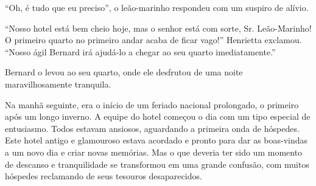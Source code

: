 ``Oh, é tudo que eu preciso'', o leão-marinho respondeu com um suspiro de alívio.

``Nosso hotel está bem cheio hoje, mas o senhor está com sorte, Sr. Leão-Marinho! O primeiro quarto no primeiro andar acaba de ficar vago!'' Henrietta exclamou. ``Nosso ágil Bernard irá ajudá-lo a chegar ao seu quarto imediatamente.''

Bernard o levou ao seu quarto, onde ele desfrutou de uma noite maravilhosamente tranquila.

\vspace{4em}
Na manhã seguinte, era o início de um feriado nacional prolongado, o primeiro após um longo inverno. A equipe do hotel começou o dia com um tipo especial de entusiasmo. Todos estavam ansiosos, aguardando a primeira onda de hóspedes. Este hotel antigo e glamouroso estava acordado e pronto para dar as boas-vindas a um novo dia e criar novas memórias. Mas o que deveria ter sido um momento de descanso e tranquilidade se transformou em uma grande confusão, com muitos hóspedes reclamando de seus tesouros desaparecidos.
